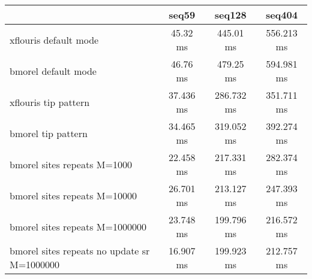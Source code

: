 \begin{tabular}{|l|c|c|c|}
\hline
 & seq59 & seq128 & seq404  \\
\hline
xflouris default mode & 45.32 ms & 445.01 ms & 556.213 ms\\
\hline
bmorel default mode & 46.76 ms & 479.25 ms & 594.981 ms\\
\hline
xflouris tip pattern & 37.436 ms & 286.732 ms & 351.711 ms\\
\hline
bmorel tip pattern & 34.465 ms & 319.052 ms & 392.274 ms\\
\hline
bmorel sites repeats M=1000 & 22.458 ms & 217.331 ms & 282.374 ms\\
\hline
bmorel sites repeats M=10000 & 26.701 ms & 213.127 ms & 247.393 ms\\
\hline
bmorel sites repeats M=1000000 & 23.748 ms & 199.796 ms & 216.572 ms\\
\hline
bmorel sites repeats no update sr  M=1000000 & 16.907 ms & 199.923 ms & 212.757 ms\\
\hline
\end{tabular}
